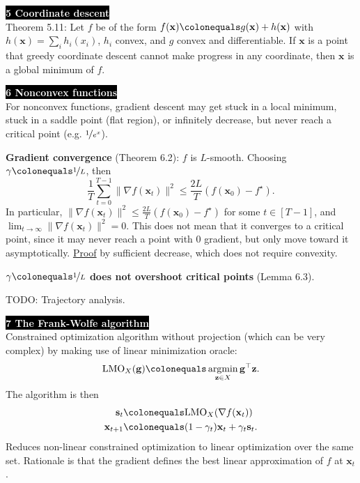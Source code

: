 \documentclass{article}
\DeclareMathOperator*{\argmin}{argmin}
\renewcommand{\vec}[1]{\mathbf{#1}}
\newcommand{\transpose}[1]{#1^\top}
\newenvironment{topic}[1]
{\textbf{\sffamily \colorbox{black}{\textcolor{white}{#1}}} \\ \vspace{0.2cm}}
{}
\begin{document}
\begin{multicols*}{3}
\begin{topic}{5 Coordinate descent}
        Theorem 5.11: Let $f$ be of the form $f(\vec{x}) \colonequals g(\vec{x}) + h(\vec{x})$ with
        $h(\vec{x}) = \sum_{i} h_i(x_i)$, $h_i$ convex, and $g$ convex and differentiable. If $\vec{x}$ is
        a point that greedy coordinate descent cannot make progress in any coordinate, then $\vec{x}$ is a
        global minimum of $f$.
    \end{topic}

    \begin{topic}{6 Nonconvex functions}
        For nonconvex functions, gradient descent may get stuck in a local minimum, stuck in a saddle
        point (flat region), or infinitely decrease, but never reach a critical point (e.g. $\nicefrac{1}{e^x}$).

        \textbf{Gradient convergence} (Theorem 6.2): $f$ is $L$-smooth. Choosing $\gamma \colonequals \nicefrac{1}{L}$, then \[
            \frac{1}{T} \sum_{t=0}^{T-1} \| \nabla f(\vec{x}_t) \|^2 \leq \frac{2L}{T} (f(\vec{x}_0) - f^\star).
        \]
        In particular, $\| \nabla f(\vec{x}_t) \|^2 \leq \frac{2L}{T} (f(\vec{x}_0) - f^\star)$ for some $t
            \in [T-1]$, and $\lim_{t \to \infty} \| \nabla f(\vec{x}_t) \|^2 = 0$. This does not mean that it
        converges to a critical point, since it may never reach a point with 0 gradient, but only move
        toward it asymptotically. \underline{Proof} by sufficient decrease, which does not require
        convexity.

        \textbf{$\gamma \colonequals \nicefrac{1}{L}$ does not overshoot critical points} (Lemma 6.3).

        TODO: Trajectory analysis.
    \end{topic}

    \begin{topic}{7 The Frank-Wolfe algorithm}
        Constrained optimization algorithm without projection (which can be very complex) by making
        use of linear minimization oracle: \[
            \mathrm{LMO}_X(\vec{g}) \colonequals \argmin_{\vec{z} \in X} \transpose{\vec{g}} \vec{z}.
        \]
        The algorithm is then
        \begin{align*}
            \vec{s}_t     & \colonequals \mathrm{LMO}_X(\nabla f(\vec{x}_t))            \\
            \vec{x}_{t+1} & \colonequals (1 - \gamma_t) \vec{x}_t + \gamma_t \vec{s}_t.
        \end{align*}
        Reduces non-linear constrained optimization to linear optimization over the same set.
        Rationale is that the gradient defines the best linear approximation of $f$ at $\vec{x}_t$.


\end{topic}
\end{multicols*}
\end{document}
